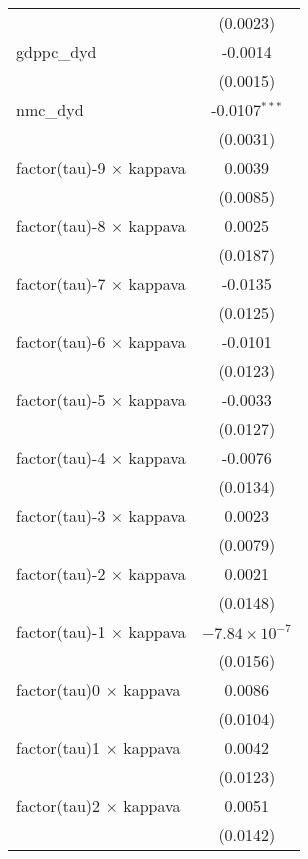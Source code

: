 \begin{tabular}{lc}
                                   & (0.0023)\\   
   gdppc\_dyd                      & -0.0014\\   
                                   & (0.0015)\\   
   nmc\_dyd                        & -0.0107$^{***}$\\   
                                   & (0.0031)\\   
   factor(tau)-9 $\times$ kappava  & 0.0039\\   
                                   & (0.0085)\\   
   factor(tau)-8 $\times$ kappava  & 0.0025\\   
                                   & (0.0187)\\   
   factor(tau)-7 $\times$ kappava  & -0.0135\\   
                                   & (0.0125)\\   
   factor(tau)-6 $\times$ kappava  & -0.0101\\   
                                   & (0.0123)\\   
   factor(tau)-5 $\times$ kappava  & -0.0033\\   
                                   & (0.0127)\\   
   factor(tau)-4 $\times$ kappava  & -0.0076\\   
                                   & (0.0134)\\   
   factor(tau)-3 $\times$ kappava  & 0.0023\\   
                                   & (0.0079)\\   
   factor(tau)-2 $\times$ kappava  & 0.0021\\   
                                   & (0.0148)\\   
   factor(tau)-1 $\times$ kappava  & $-7.84\times 10^{-7}$\\    
                                   & (0.0156)\\   
   factor(tau)0 $\times$ kappava   & 0.0086\\   
                                   & (0.0104)\\   
   factor(tau)1 $\times$ kappava   & 0.0042\\   
                                   & (0.0123)\\   
   factor(tau)2 $\times$ kappava   & 0.0051\\   
                                   & (0.0142)\\   

\end{tabular}
